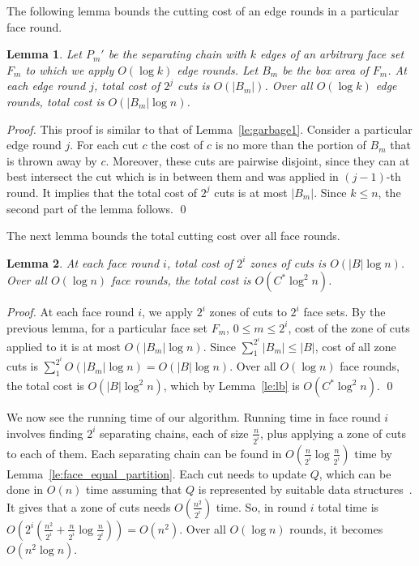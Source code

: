 \documentclass{llncs}
\newtheorem{lem}{Lemma}
\begin{document}
The following lemma bounds the cutting cost of an edge rounds in a particular face round.

\begin{lem}
Let ${P}_m'$ be the separating chain with $k$ edges of an arbitrary face set $F_m$ 
to which we apply $O(\log k)$ edge rounds.
Let $B_m$ be the box area of $F_m$.
At each edge round $j$, total cost of $2^j$ cuts is $O(|B_m|)$.
Over all $O(\log k)$ edge rounds, total cost is $O(|B_m|\log n)$.
\end{lem}


\begin{proof}
This proof is similar to that of Lemma~\ref{le:garbage1}.
Consider a particular edge round $j$.
For each cut $c$ the cost of $c$ is no more than the portion of $B_m$ that is thrown away by $c$.
Moreover, these cuts are pairwise disjoint, 
since they can at best intersect the cut which is in between them and was applied in $(j-1)$-th round.
It implies that the total cost of $2^j$ cuts is at most $|B_m|$.
Since $k\le n$, the second part of the lemma follows.
\qed
\end{proof}

The next lemma bounds the total cutting cost over all face rounds.

\begin{lem}
At each face round $i$, total cost of $2^i$ zones of cuts is $O(|B|\log n)$.
Over all $O(\log n)$ face rounds, the total cost is $O(C^*\log^2n)$.
\end{lem}

\begin{proof}
At each face round $i$, we apply $2^i$ zones of cuts to $2^i$ face sets.
By the previous lemma, for a particular face set $F_m$, $0\le m\le 2^i$,
cost of the zone of cuts applied to it is at most $O(|B_m|\log n)$.
Since $\sum_{1}^{2^{i}} |B_m| \le |B|$, cost of all zone cuts is 
$\sum_{1}^{2^i} O(|B_m|\log n) = O(|B|\log n)$.
Over all $O(\log n)$ face rounds, the total cost is $O(|B|\log^2n)$,
which  by Lemma~\ref{le:lb} is $O(C^*\log^2n)$. 
\qed
\end{proof}


We now see the running time of our algorithm.
Running time in face round $i$ involves finding $2^i$ separating chains,
each of size  $\frac{n}{2^i}$, 
plus applying a zone of cuts to each of them. 
Each separating chain 
can be found in $O(\frac{n}{2^i}\log \frac{n}{2^i})$ time by Lemma~\ref{le:face_equal_partition}.
Each cut needs to update $Q$, which can be done in $O(n)$ time assuming that $Q$ is 
represented by suitable data structures~\cite{berg}.
It gives that a zone of cuts needs $O(\frac{n^2}{2^i})$ time.
So, in round $i$ total time is $ O(2^i(\frac{n^2}{2^i}+\frac{n}{2^i}\log \frac{n}{2^i}))=O(n^2)$.
Over all $O(\log n)$ rounds, it becomes $O(n^2\log n)$.
\end{document}
